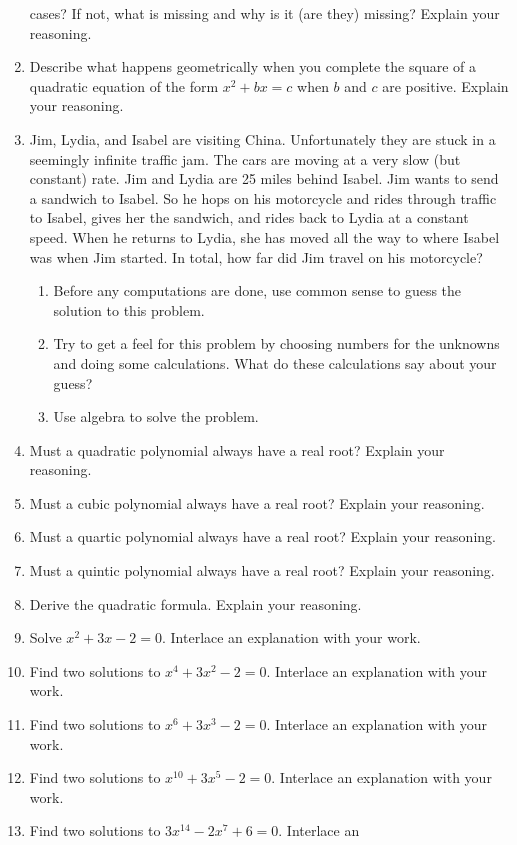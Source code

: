 \begin{problems}
\begin{enumerate}
cases? If not, what is missing and why is it (are they)
missing? Explain your reasoning.
\item Describe what happens geometrically when you complete the square
  of a quadratic equation of the form $x^2 + bx = c$ when $b$ and $c$
  are positive. Explain your reasoning.
\item Jim, Lydia, and Isabel are visiting China. Unfortunately they are
  stuck in a seemingly infinite traffic jam. The cars are moving at a
  very slow (but constant) rate. Jim and Lydia are 25 miles behind
  Isabel. Jim wants to send a sandwich to Isabel. So he hops on his
  motorcycle and rides through traffic to Isabel, gives her the
  sandwich, and rides back to Lydia at a constant speed. When he
  returns to Lydia, she has moved all the way to where Isabel was when
  Jim started. In total, how far did Jim travel on his motorcycle?
\begin{enumerate}
\item Before any computations are done, use common sense to guess the
  solution to this problem.
\item Try to get a feel for this problem by choosing numbers for the
  unknowns and doing some calculations. What do these calculations say
  about your guess?
\item Use algebra to solve the problem.
\end{enumerate}
\item Must a quadratic polynomial always have a real root? Explain
  your reasoning.
\item Must a cubic polynomial always have a real root? Explain your
  reasoning.
\item Must a quartic polynomial always have a real root? Explain your
  reasoning.
\item Must a quintic polynomial always have a real root? Explain your
  reasoning.
\item Derive the quadratic formula. Explain your reasoning.
\item Solve $x^2 + 3x -2 = 0$. Interlace an explanation with your work.
\item Find two solutions to $x^4 + 3x^2 -2 = 0$. Interlace an
  explanation with your work.
\item Find two solutions to $x^6 + 3x^3 -2 = 0$. Interlace an
  explanation with your work.
\item Find two solutions to $x^{10} + 3x^5 -2 = 0$. Interlace an
  explanation with your work.
\item Find two solutions to $3x^{14} - 2x^7 + 6 = 0$. Interlace an

\end{enumerate}
\end{problems}
